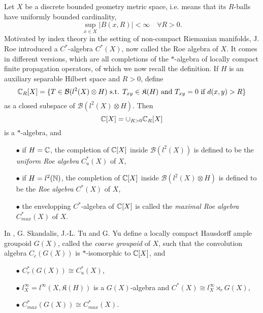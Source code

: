 

Let $X$ be a discrete bounded geometry metric space, i.e. means that its $R$-balls have uniformly bounded cardinality, 
\[\sup_{x\in X} |B(x,R)| < \infty \quad \forall R>0.\]
Motivated by index theory in the setting of non-compact Riemanian manifolds, J. Roe introduced a $C^*$-algebra $C^*(X)$, now called the Roe algebra of $X$. It comes in different versions, which are all completions of the $*$-algebra of locally compact finite propagation operators, of which we now recall the definition. If $H$ is an auxiliary separable Hilbert space and $R>0$, define 
\[ \mathbb C_R[X] = \{T\in\mathcal B(l^2(X)\otimes H)\text{ s.t. } T_{xy}\in \mathfrak K(H) \text{ and } T_{xy} = 0 \text{ if } d(x,y)>R \} \]
as a closed subspace of $\mathcal B(l^2(X)\otimes H)$. Then 
\[\mathbb C[X] = \cup_{R>0} \mathbb C_R[X]\]
is a $*$-algebra, and
\begin{itemize}
\item[$\bullet$] if $H=\mathbb C$, the completion of $\mathbb C[X]$ inside $\mathcal B(l^2(X))$ is defined to be the \textit{uniform Roe algebra} $C_u^*(X)$ of $X$,
\item[$\bullet$] if $H=l^2(\mathbb N)$, the completion of $\mathbb C[X]$ inside $\mathcal B(l^2(X)\otimes H)$ is defined to be the \textit{Roe algebra} $C^*(X)$  of $X$,
\item[$\bullet$] the envelopping $C^*$-algebra of $\mathbb C[X]$ is called the \textit{maximal Roe algebra} $C_{max}^*(X)$  of $X$.
\end{itemize}
In \cite{SkTuYu}, G. Skandalis, J.-L. Tu and G. Yu define a locally compact Hausdorff ample groupoid $G(X)$, called the \textit{coarse groupoid} of $X$, such that the convolution algebra $C_c(G(X))$ is $*$-isomorphic to $\mathbb C[X]$, and 
\begin{itemize}
\item[$\bullet$] $C^*_r(G(X)) \cong C_u^*(X)$,
\item[$\bullet$] $l^\infty_X=l^\infty(X, \mathfrak K(H))$ is a $G(X)$-algebra and $C^*(X)\cong l^\infty_X \rtimes_r G(X)$,
\item[$\bullet$] $C_{max}^*(G(X)) \cong C_{max}^*(X)$.
\end{itemize}

